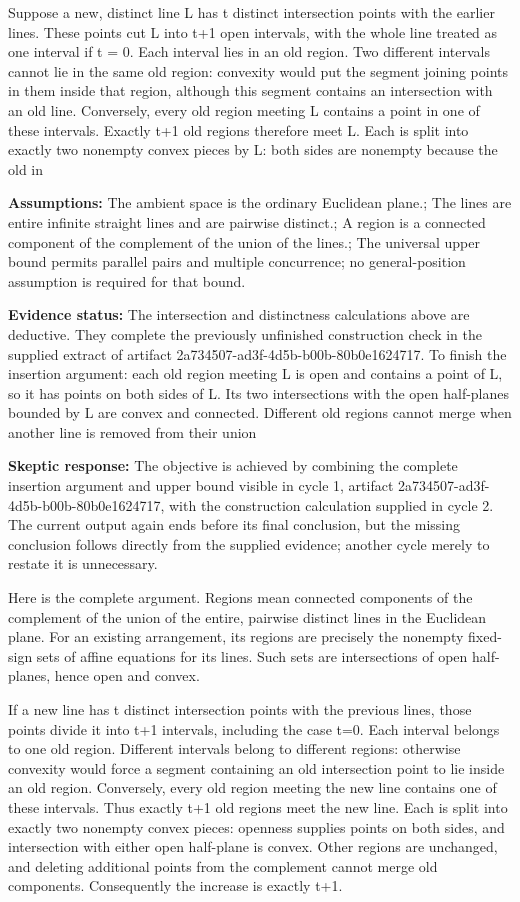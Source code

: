 \documentclass[11pt]{article}
\begin{document}
Suppose a new, distinct line L has t distinct intersection points with the earlier lines. These points cut L into t+1 open intervals, with the whole line treated as one interval if t = 0. Each interval lies in an old region. Two different intervals cannot lie in the same old region: convexity would put the segment joining points in them inside that region, although this segment contains an intersection with an old line. Conversely, every old region meeting L contains a point in one of these intervals. Exactly t+1 old regions therefore meet L. Each is split into exactly two nonempty convex pieces by L: both sides are nonempty because the old in­\par
\textbf{Assumptions:} The ambient space is the ordinary Euclidean plane.; The lines are entire infinite straight lines and are pairwise distinct.; A region is a connected component of the complement of the union of the lines.; The universal upper bound permits parallel pairs and multiple concurrence; no general-position assumption is required for that bound.\par
\textbf{Evidence status:} The intersection and distinctness calculations above are deductive. They complete the previously unfinished construction check in the supplied extract of artifact 2a734507-ad3f-4d5b-b00b-80b0e1624717. To finish the insertion argument: each old region meeting L is open and contains a point of L, so it has points on both sides of L. Its two intersections with the open half-planes bounded by L are convex and connected. Different old regions cannot merge when another line is removed from their union\par
\textbf{Skeptic response:} The objective is achieved by combining the complete insertion argument and upper bound visible in cycle 1, artifact 2a734507-ad3f-4d5b-b00b-80b0e1624717, with the construction calculation supplied in cycle 2. The current output again ends before its final conclusion, but the missing conclusion follows directly from the supplied evidence; another cycle merely to restate it is unnecessary.

Here is the complete argument. Regions mean connected components of the complement of the union of the entire, pairwise distinct lines in the Euclidean plane. For an existing arrangement, its regions are precisely the nonempty fixed-sign sets of affine equations for its lines. Such sets are intersections of open half-planes, hence open and convex.

If a new line has t distinct intersection points with the previous lines, those points divide it into t+1 intervals, including the case t=0. Each interval belongs to one old region. Different intervals belong to different regions: otherwise convexity would force a segment containing an old intersection point to lie inside an old region. Conversely, every old region meeting the new line contains one of these intervals. Thus exactly t+1 old regions meet the new line. Each is split into exactly two nonempty convex pieces: openness supplies points on both sides, and intersection with either open half-plane is convex. Other regions are unchanged, and deleting additional points from the complement cannot merge old components. Consequently the increase is exactly t+1.
\end{document}
